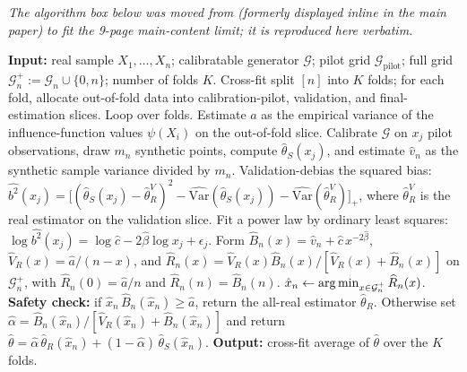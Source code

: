 \label{app:algbox}

\emph{The algorithm box below was moved from  (formerly displayed inline in the main paper) to fit the 9-page main-content limit; it is reproduced here verbatim.}

\begin{algorithm}[!h]
\caption{Corrected adaptive Generalized-Neyman estimator.}
\label{alg:adaptive}
\begin{algorithmic}[1]
\State \textbf{Input:} real sample $X_1,\dots,X_n$; calibratable generator $\mathcal{G}$; pilot grid $\mathcal{G}_{\mathrm{pilot}}$; full grid $\mathcal{G}_n^+:=\mathcal{G}_n\cup\{0,n\}$; number of folds $K$.
\State Cross-fit split $[n]$ into $K$ folds; for each fold, allocate out-of-fold data into calibration-pilot, validation, and final-estimation slices. Loop over folds.
\State Estimate $\hat a$ as the empirical variance of the influence-function values $\psi(X_i)$ on the out-of-fold slice.
  \State Calibrate $\mathcal{G}$ on $x_j$ pilot observations, draw $m_n$ synthetic points, compute $\hat\theta_S(x_j)$, and estimate $\hat v_n$ as the synthetic sample variance divided by $m_n$.
  \State Validation-debias the squared bias: $\widehat{b^2}(x_j)=\bigl[(\hat\theta_S(x_j)-\hat\theta_R^V)^2-\widehat{\mathrm{Var}}(\hat\theta_S(x_j))-\widehat{\mathrm{Var}}(\hat\theta_R^V)\bigr]_+$, where $\hat\theta_R^V$ is the real estimator on the validation slice.
\EndFor
\State Fit a power law by ordinary least squares: $\log\widehat{b^2}(x_j)=\log\hat c-2\hat\beta\log x_j+\epsilon_j$.
\State Form $\widehat{B}_n(x)=\hat v_n+\hat c\,x^{-2\hat\beta}$, $\widehat V_R(x)=\hat a/(n-x)$, and $\widehat R_n(x)=\widehat V_R(x)\widehat{B}_n(x)/[\widehat V_R(x)+\widehat{B}_n(x)]$ on $\mathcal{G}_n^+$, with $\widehat R_n(0)=\hat a/n$ and $\widehat R_n(n)=\widehat{B}_n(n)$.
\State $\hat x_n\gets \operatorname*{arg\,min}_{x\in\mathcal{G}_n^+}\widehat R_n(x)$.
\State \textbf{Safety check:} if $\hat x_n\,\widehat{B}_n(\hat x_n)\ge\hat a$, return the all-real estimator $\hat\theta_R$.
\State Otherwise set $\hat\alpha=\widehat{B}_n(\hat x_n)/[\widehat V_R(\hat x_n)+\widehat{B}_n(\hat x_n)]$ and return $\hat\theta=\hat\alpha\,\hat\theta_R(\hat x_n)+(1-\hat\alpha)\,\hat\theta_S(\hat x_n)$.
\State \textbf{Output:} cross-fit average of $\hat\theta$ over the $K$ folds.
\end{algorithmic}
\end{algorithm}
